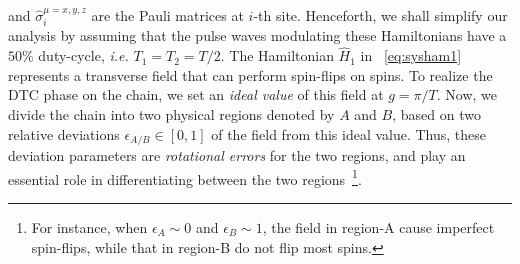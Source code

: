 \documentclass[12pt]{iopart}
\providecommand{\DIFaddtex}[1]{{\protect\color{red}\uwave{#1}}} %
\providecommand{\DIFdeltex}[1]{{}}                      %
\providecommand{\DIFaddbegin}{} %
\providecommand{\DIFaddend}{} %
\providecommand{\DIFdelbegin}{} %
\providecommand{\DIFdelend}{} %
\providecommand{\DIFadd}[1]{\texorpdfstring{\DIFaddtex{#1}}{#1}} %
\providecommand{\DIFdel}[1]{\texorpdfstring{\DIFdeltex{#1}}{}} %
\newcommand{\DIFscaledelfig}{0.5}
\newlength{\DIFdelgraphicswidth} %
\newlength{\DIFdelgraphicsheight} %
\newcommand{\DIFaddincludegraphics}[2][]{{\color{blue}\fbox{\DIFOincludegraphics[#1]{#2}}}} %
\newcommand{\DIFdelincludegraphics}[2][]{%
\sbox{\DIFdelgraphicsbox}{\DIFOincludegraphics[#1]{#2}}%
\settoboxwidth{\DIFdelgraphicswidth}{\DIFdelgraphicsbox} %
\settoboxtotalheight{\DIFdelgraphicsheight}{\DIFdelgraphicsbox} %
\scalebox{\DIFscaledelfig}{%
\parbox[b]{\DIFdelgraphicswidth}{\usebox{\DIFdelgraphicsbox}\\[-\baselineskip] \rule{\DIFdelgraphicswidth}{0em}}\llap{\resizebox{\DIFdelgraphicswidth}{\DIFdelgraphicsheight}{%
\setlength{\unitlength}{\DIFdelgraphicswidth}%
\begin{picture}(1,1)%
\thicklines\linethickness{2pt} %
{\color[rgb]{1,0,0}\put(0,0){\framebox(1,1){}}}%
{\color[rgb]{1,0,0}\put(0,0){\line( 1,1){1}}}%
{\color[rgb]{1,0,0}\put(0,1){\line(1,-1){1}}}%
\end{picture}%
}\hspace*{3pt}}} %
} %
\DeclareRobustCommand{\DIFaddbegin}{\DIFOaddbegin \let\includegraphics\DIFaddincludegraphics} %
\DeclareRobustCommand{\DIFaddend}{\DIFOaddend \let\includegraphics\DIFOincludegraphics} %
\DeclareRobustCommand{\DIFdelbegin}{\DIFOdelbegin \let\includegraphics\DIFdelincludegraphics} %
\DeclareRobustCommand{\DIFdelend}{\DIFOaddend \let\includegraphics\DIFOincludegraphics} %
\begin{document}
and $\hat{\sigma}^{\mu=x,y,z}_i$ are the Pauli matrices at $i$-th site.  Henceforth, we shall simplify our analysis by assuming that the pulse waves modulating these Hamiltonians have a $50 \%$ duty-cycle, \textit{i.e.} $T_1=T_2=T/2$.  The Hamiltonian $\hat{H}_1$ in \DIFdelbegin \DIFdel{Eq.}\DIFdelend \DIFaddbegin \DIFadd{equation}\DIFaddend ~\eqref{eq:sysham1} represents a transverse field that can perform spin-flips on spins. To realize the DTC phase on the chain, we set an \textit{ideal value} of this field at $g=\pi/T$. Now, we divide the chain into two physical regions denoted by $A$ and $B$, based on two relative deviations $\epsilon_{A/B}\in[0,1]$ of the field from this ideal value. Thus, these deviation parameters are \textit{rotational errors} for the two regions, and play an essential role in differentiating between the two regions~\footnote{For instance, when $\epsilon_A \sim 0$ and $\epsilon_B \sim 1$, the field in region-A cause imperfect spin-flips, while that in region-B do not flip most spins.}.
\end{document}
